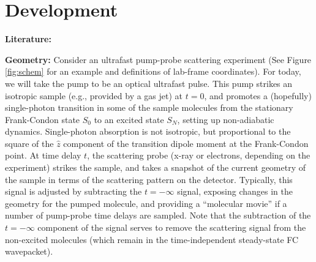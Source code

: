\documentclass[fleqn,oneside,12pt]{article}
\date{}
\begin{document}

\section{Development}

\textbf{Literature:} 

\textbf{Geometry:} Consider an ultrafast pump-probe scattering experiment (See
Figure \ref{fig:schem} for an example and definitions of lab-frame coordinates).
For today, we will take the pump to be an optical ultrafast pulse. This pump
strikes an isotropic sample (e.g., provided by a gas jet) at $t=0$, and promotes
a (hopefully) single-photon transition in some of the sample molecules from the
stationary Frank-Condon state $S_{0}$ to an excited state $S_{N}$, setting up
non-adiabatic dynamics. Single-photon absorption is not isotropic, but
proportional to the square of the $\hat z$ component of the transition dipole
moment at the Frank-Condon point. At time delay $t$, the scattering probe (x-ray
or electrons, depending on the experiment) strikes the sample, and takes a
snapshot of the current geometry of the sample in terms of the scattering
pattern on the detector.  Typically, this signal is adjusted by subtracting the
$t=-\infty$ signal, exposing changes in the geometry for the pumped molecule,
and providing a ``molecular movie'' if a number of pump-probe time delays are
sampled. Note that the subtraction of the $t=-\infty$ component of the signal
serves to remove the scattering signal from the non-excited molecules (which
remain in the time-independent steady-state FC wavepacket).
\end{document}
